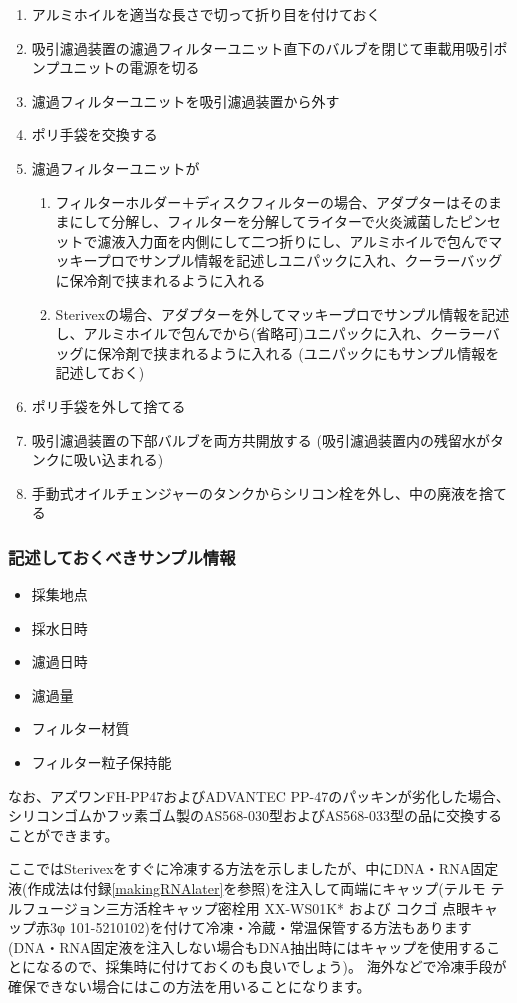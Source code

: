 \documentclass[titlepage,10pt,a4paper,uplatex]{jsbook}
\begin{document}
\begin{enumerate}
\item アルミホイルを適当な長さで切って折り目を付けておく
\item 吸引濾過装置の濾過フィルターユニット直下のバルブを閉じて車載用吸引ポンプユニットの電源を切る
\item 濾過フィルターユニットを吸引濾過装置から外す
\item ポリ手袋を交換する
\item 濾過フィルターユニットが
\begin{enumerate}
\item フィルターホルダー＋ディスクフィルターの場合、アダプターはそのままにして分解し、フィルターを分解してライターで火炎滅菌したピンセットで濾液入力面を内側にして二つ折りにし、アルミホイルで包んでマッキープロでサンプル情報を記述しユニパックに入れ、クーラーバッグに保冷剤で挟まれるように入れる
\item Sterivexの場合、アダプターを外してマッキープロでサンプル情報を記述し、アルミホイルで包んでから(省略可)ユニパックに入れ、クーラーバッグに保冷剤で挟まれるように入れる (ユニパックにもサンプル情報を記述しておく)
\end{enumerate}
\item ポリ手袋を外して捨てる
\item 吸引濾過装置の下部バルブを両方共開放する (吸引濾過装置内の残留水がタンクに吸い込まれる)
\item 手動式オイルチェンジャーのタンクからシリコン栓を外し、中の廃液を捨てる
\end{enumerate}

\subsubsection{記述しておくべきサンプル情報}
\begin{itemize}
\item 採集地点
\item 採水日時
\item 濾過日時
\item 濾過量
\item フィルター材質
\item フィルター粒子保持能
\end{itemize}

なお、アズワンFH-PP47およびADVANTEC PP-47のパッキンが劣化した場合、シリコンゴムかフッ素ゴム製のAS568-030型およびAS568-033型の品に交換することができます。

ここではSterivexをすぐに冷凍する方法を示しましたが、中にDNA・RNA固定液(作成法は付録\ref{makingRNAlater}を参照)を注入して両端にキャップ(テルモ テルフュージョン三方活栓キャップ密栓用 XX-WS01K* および コクゴ 点眼キャップ赤3φ 101-5210102)を付けて冷凍・冷蔵・常温保管する方法もあります(DNA・RNA固定液を注入しない場合もDNA抽出時にはキャップを使用することになるので、採集時に付けておくのも良いでしょう)。
海外などで冷凍手段が確保できない場合にはこの方法を用いることになります。
\end{document}

